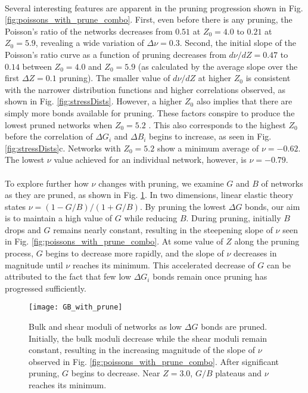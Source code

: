 \documentclass[9pt,twocolumn,twoside]{pnas-new}
\begin{document}
\paragraph{}
Several interesting features are apparent in the pruning progression shown in Fig. \ref{fig:poissons_with_prune_combo}. First, even before there is any pruning, the Poisson's ratio of the networks  decreases from $0.51$ at $Z_{0}=4.0$ to $0.21$ at $Z_{0}=5.9$, revealing a wide variation of $\Delta \nu=0.3$. Second, the initial slope of the Poisson's ratio curve as a function of pruning decreases from $d\nu/dZ = 0.47$ to $0.14$ between $Z_0=4.0$ and $Z_0=5.9$ (as calculated by the average slope over the first $\Delta Z = 0.1$ pruning).  The smaller value of $d\nu/dZ$ at higher $Z_{0}$ is consistent with the narrower distribution functions and higher correlations observed, as shown in Fig. \ref{fig:stressDists}.  However, a higher $Z_{0}$ also implies that there are simply more bonds available for pruning. These factors conspire to produce the lowest pruned networks when $Z_{0}=5.2$ . This also corresponds to the highest $Z_{0}$ before the correlation of $\Delta G_{i}$ and $\Delta B_{i}$ begins to increase, as seen in Fig. \ref{fig:stressDists}c. Networks with $Z_{0}=5.2$  show a minimum average of $\nu=-0.62$. The lowest $\nu$ value achieved for an individual network, however, is $\nu=-0.79$.

\paragraph{}
To explore further how $\nu$ changes with pruning, we examine $G$ and $B$ of networks as they are pruned, as shown in Fig. \ref{fig:GB_with_prune}.  In two dimensions, linear elastic theory states $\nu=(1-G/B)/(1+G/B)$.  By pruning the lowest $\Delta G$ bonds, our aim is to maintain a high value of $G$ while reducing $B$.  During pruning, initially $B$ drops and $G$ remains nearly constant, resulting in the steepening slope of $\nu$ seen in Fig.  \ref{fig:poissons_with_prune_combo}.  At some value of $Z$ along the pruning process, $G$ begins to decrease more rapidly, and the slope of $\nu$ decreases in magnitude until $\nu$ reaches its minimum.  This accelerated decrease of $G$ can be attributed to the fact that few low $\Delta G_{i}$ bonds remain once pruning has progressed sufficiently.

\begin{figure}
	\centering
	\texttt{[image: GB\_with\_prune]}
	\caption{Bulk and shear moduli of networks as low $\Delta G$ bonds are pruned.  Initially, the bulk moduli decrease while the shear moduli remain constant, resulting in the increasing magnitude of the slope of $\nu$ observed in Fig. \ref{fig:poissons_with_prune_combo}.  After significant pruning, $G$ begins to decrease.  Near $Z=3.0$, $G/B$ plateaus and $\nu$ reaches its minimum.}
	\label{fig:GB_with_prune}
\end{figure}
\end{document}
